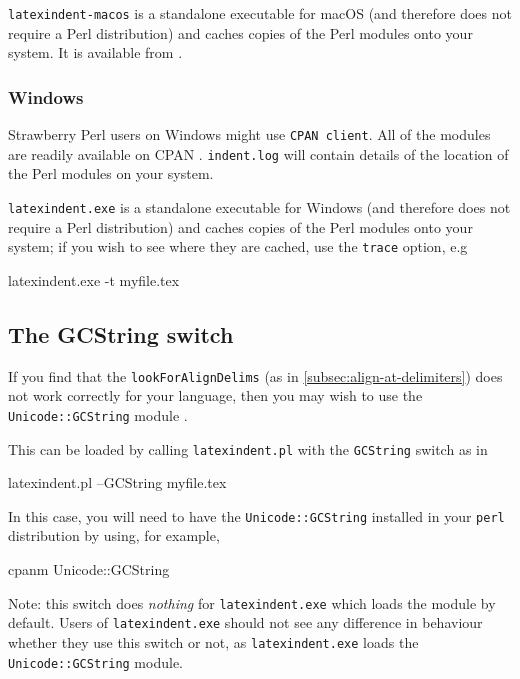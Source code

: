 \documentclass[10pt]{article}
\begin{document}
  \texttt{latexindent-macos} is a standalone executable  for macOS (and therefore does not require a Perl distribution)
  and caches copies of the Perl modules onto your system. It is available from \cite{latexindent-home}.
    

 \subsubsection{Windows}
  Strawberry Perl users on Windows might use \texttt{CPAN client}. All of the modules are
  readily available on CPAN \cite{cpan}. \texttt{indent.log} will contain details of the
  location of the Perl modules on your system.

  \texttt{latexindent.exe} is a standalone executable
  for Windows (and therefore does not require a Perl distribution) and caches copies of the
  Perl modules onto your system; if you wish to see where they are cached, use the
  \texttt{trace} option, e.g
  \begin{dosprompt}
latexindent.exe -t myfile.tex
 \end{dosprompt}

 \subsection{The GCString switch}\label{subsec:the-GCString}
  If you find that the \texttt{lookForAlignDelims} (as in \cref{subsec:align-at-delimiters}) does not work correctly
  for your language, then you may wish to use the \texttt{Unicode::GCString} module .

  This can be loaded by calling \texttt{latexindent.pl} with the \texttt{GCString} switch
  as in

  \begin{commandshell}
latexindent.pl --GCString myfile.tex
\end{commandshell}

  In this case, you will need to have the \texttt{Unicode::GCString} installed in your
  \texttt{perl} distribution by using, for example,

  \begin{commandshell}
cpanm Unicode::GCString
\end{commandshell}

  Note: this switch does \emph{nothing} for \texttt{latexindent.exe} which loads the
  module by default. Users of \texttt{latexindent.exe} should not see any difference in
  behaviour whether they use this switch or not, as \texttt{latexindent.exe} loads the
  \texttt{Unicode::GCString} module.
\end{document}
